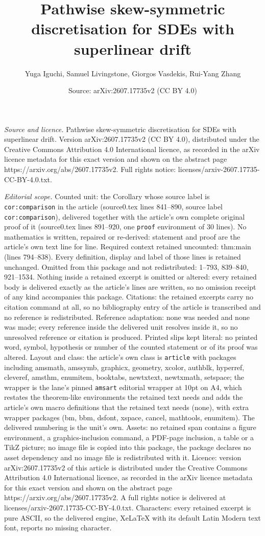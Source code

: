 \documentclass[10pt,a4paper]{amsart}
\title[Pathwise skew-symmetric discretisation for SDEs with superli]{Pathwise skew-symmetric discretisation for SDEs with superlinear drift}
\author{Yuga Iguchi, Samuel Livingstone, Giorgos Vasdekis, Rui-Yang Zhang}
\date{Source: arXiv:2607.17735v2 (CC BY 4.0)}
\begin{document}
\maketitle

\noindent\emph{Source and licence.} Pathwise skew-symmetric discretisation for SDEs with superlinear drift. Version arXiv:2607.17735v2 (CC BY 4.0), distributed under the Creative Commons Attribution 4.0 International licence, as recorded in the arXiv licence metadata for this exact version and shown on the abstract page https://arxiv.org/abs/2607.17735v2. Full rights notice: licenses/arxiv-2607.17735-CC-BY-4.0.txt.\par\smallskip

\noindent\textit{Editorial scope.} Counted unit: the Corollary whose source label is \texttt{cor:comparison} in the article (source0.tex lines 841--890, source label \texttt{cor:comparison}), delivered together with the article's own complete original proof of it (source0.tex lines 891--920, one \texttt{proof} environment of 30 lines). No mathematics is written, repaired or re-derived: statement and proof are the article's own text line for line. Required context retained uncounted: thm:main (lines 794--838). Every definition, display and label of those lines is retained unchanged. Omitted from this package and not redistributed: 1--793, 839--840, 921--1534. Nothing inside a retained excerpt is omitted or altered: every retained body is delivered exactly as the article's lines are written, so no omission receipt of any kind accompanies this package. Citations: the retained excerpts carry no citation command at all, so no bibliography entry of the article is transcribed and no reference is redistributed. Reference adaptation: none was needed and none was made; every reference inside the delivered unit resolves inside it, so no unresolved reference or citation is produced. Printed slips kept literal: no printed word, symbol, hypothesis or number of the counted statement or of its proof was altered. Layout and class: the article's own class is \texttt{article} with packages including amsmath, amssymb, graphicx, geometry, xcolor, authblk, hyperref, cleveref, amsthm, enumitem, booktabs, newtxtext, newtxmath, setspace; the wrapper is the lane's pinned \texttt{amsart} editorial wrapper at 10pt on A4, which restates the theorem-like environments the retained text needs and adds the article's own macro definitions that the retained text needs (none), with extra wrapper packages (bm, bbm, dsfont, xspace, cancel, mathtools, enumitem). The delivered numbering is the unit's own. Assets: no retained span contains a figure environment, a graphics-inclusion command, a PDF-page inclusion, a table or a TikZ picture; no image file is copied into this package, the package declares no asset dependency and no image file is redistributed with it. Licence: version arXiv:2607.17735v2 of this article is distributed under the Creative Commons Attribution 4.0 International licence, as recorded in the arXiv licence metadata for this exact version and shown on the abstract page https://arxiv.org/abs/2607.17735v2. A full rights notice is delivered at licenses/arxiv-2607.17735-CC-BY-4.0.txt. Characters: every retained excerpt is pure ASCII, so the delivered engine, XeLaTeX with its default Latin Modern text font, reports no missing character.
\end{document}
